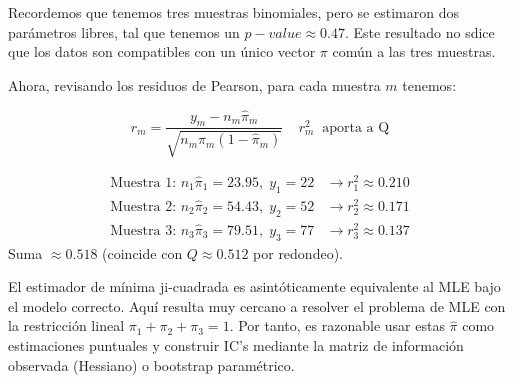 Recordemos que tenemos tres muestras binomiales, pero se estimaron dos parámetros libres, tal que tenemos
un $p-value \approx 0.47$. Este resultado no sdice que los datos son compatibles con un único vector 
$\pi$ común a las tres muestras. 

Ahora, revisando los residuos de Pearson, para cada muestra $m$ tenemos:

\[  
    r_m = \frac{y_m - n_m \hat{\pi}_m}{\sqrt{n_m \hat{\pi}_m(1 - \hat{\pi}_m)}} \;\;\;\; r_m^2 \;\; \text{aporta a Q}
\]

\begin{align*}
    \text{Muestra 1: } n_1\hat{\pi}_1 = 23.95, \; y_1=22 & \rightarrow r_1^2 \approx 0.210 \\
    \text{Muestra 2: } n_2\hat{\pi}_2 = 54.43, \; y_2=52 & \rightarrow r_2^2 \approx 0.171 \\
    \text{Muestra 3: } n_3\hat{\pi}_3 = 79.51, \; y_3=77 & \rightarrow r_3^2 \approx 0.137
\end{align*}
Suma $\approx 0.518$ (coincide con $Q \approx 0.512$ por redondeo).

El estimador de mínima ji-cuadrada es asintóticamente equivalente al MLE bajo el modelo correcto.
Aquí resulta muy cercano a resolver el problema de MLE con la restricción lineal 
$\pi_1 + \pi_2 + \pi_3 = 1$. Por tanto, es razonable usar estas $\hat{\pi}$ como 
estimaciones puntuales y construir IC's mediante la matriz de información observada 
(Hessiano) o bootstrap paramétrico.

\clearpage